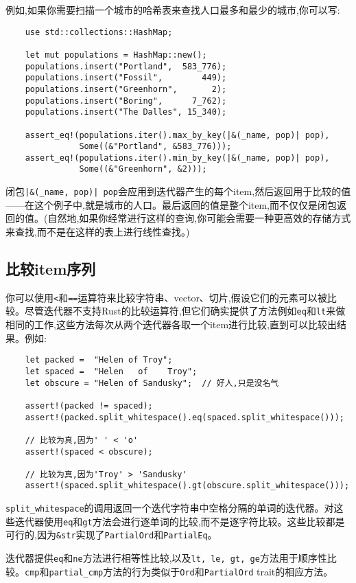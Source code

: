 例如,如果你需要扫描一个城市的哈希表来查找人口最多和最少的城市,你可以写:
\begin{verbatim}
    use std::collections::HashMap;

    let mut populations = HashMap::new();
    populations.insert("Portland",  583_776);
    populations.insert("Fossil",        449);
    populations.insert("Greenhorn",       2);
    populations.insert("Boring",      7_762);
    populations.insert("The Dalles", 15_340);

    assert_eq!(populations.iter().max_by_key(|&(_name, pop)| pop),
               Some((&"Portland", &583_776)));
    assert_eq!(populations.iter().min_by_key(|&(_name, pop)| pop),
               Some((&"Greenhorn", &2)));
\end{verbatim}

闭包\texttt{|\&(\_name, pop)| pop}会应用到迭代器产生的每个item,然后返回用于比较的值——在这个例子中,就是城市的人口。最后返回的值是整个item,而不仅仅是闭包返回的值。(自然地,如果你经常进行这样的查询,你可能会需要一种更高效的存储方式来查找,而不是在这样的表上进行线性查找。)

\subsection{比较item序列}
你可以使用\texttt{<}和\texttt{==}运算符来比较字符串、vector、切片,假设它们的元素可以被比较。尽管迭代器不支持Rust的比较运算符,但它们确实提供了方法例如\texttt{eq}和\texttt{lt}来做相同的工作,这些方法每次从两个迭代器各取一个item进行比较,直到可以比较出结果。例如:
\begin{verbatim}
    let packed =  "Helen of Troy";
    let spaced =  "Helen   of    Troy";
    let obscure = "Helen of Sandusky";  // 好人,只是没名气

    assert!(packed != spaced);
    assert!(packed.split_whitespace().eq(spaced.split_whitespace()));

    // 比较为真,因为' ' < 'o'
    assert!(spaced < obscure);

    // 比较为真,因为'Troy' > 'Sandusky'
    assert!(spaced.split_whitespace().gt(obscure.split_whitespace()));
\end{verbatim}

\texttt{split\_whitespace}的调用返回一个迭代字符串中空格分隔的单词的迭代器。对这些迭代器使用\texttt{eq}和\texttt{gt}方法会进行逐单词的比较,而不是逐字符比较。这些比较都是可行的,因为\texttt{\&str}实现了\texttt{PartialOrd}和\texttt{PartialEq}。

迭代器提供\texttt{eq}和\texttt{ne}方法进行相等性比较,以及\texttt{lt, le, gt, ge}方法用于顺序性比较。\texttt{cmp}和\texttt{partial\_cmp}方法的行为类似于\texttt{Ord}和\texttt{PartialOrd} trait的相应方法。

